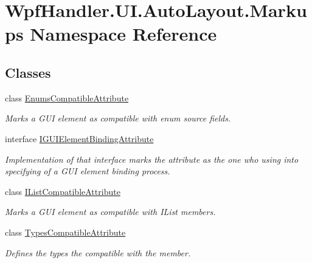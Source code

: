 \hypertarget{namespace_wpf_handler_1_1_u_i_1_1_auto_layout_1_1_markups}{}\section{Wpf\+Handler.\+U\+I.\+Auto\+Layout.\+Markups Namespace Reference}
\label{namespace_wpf_handler_1_1_u_i_1_1_auto_layout_1_1_markups}
\subsection*{Classes}
\begin{DoxyCompactItemize}
\item 
class \mbox{\hyperlink{class_wpf_handler_1_1_u_i_1_1_auto_layout_1_1_markups_1_1_enums_compatible_attribute}{Enums\+Compatible\+Attribute}}
\begin{DoxyCompactList}\small\item\em Marks a G\+UI element as compatible with enum source fields. \end{DoxyCompactList}\item 
interface \mbox{\hyperlink{interface_wpf_handler_1_1_u_i_1_1_auto_layout_1_1_markups_1_1_i_g_u_i_element_binding_attribute}{I\+G\+U\+I\+Element\+Binding\+Attribute}}
\begin{DoxyCompactList}\small\item\em Implementation of that interface marks the attribute as the one who using into specifying of a G\+UI element binding process. \end{DoxyCompactList}\item 
class \mbox{\hyperlink{class_wpf_handler_1_1_u_i_1_1_auto_layout_1_1_markups_1_1_i_list_compatible_attribute}{I\+List\+Compatible\+Attribute}}
\begin{DoxyCompactList}\small\item\em Marks a G\+UI element as compatible with I\+List members. \end{DoxyCompactList}\item 
class \mbox{\hyperlink{class_wpf_handler_1_1_u_i_1_1_auto_layout_1_1_markups_1_1_types_compatible_attribute}{Types\+Compatible\+Attribute}}
\begin{DoxyCompactList}\small\item\em Defines the types the compatible with the member. \end{DoxyCompactList}\end{DoxyCompactItemize}
